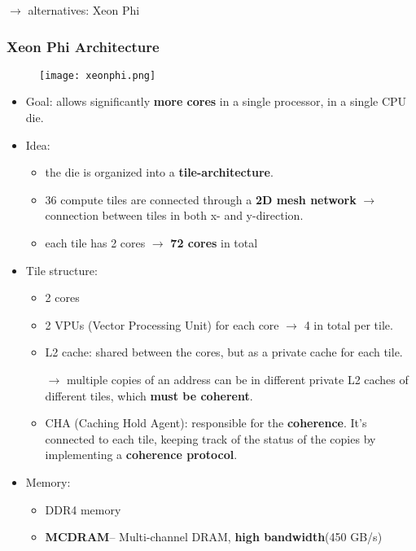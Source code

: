 $\rightarrow$ alternatives: Xeon Phi

\subsubsection{Xeon Phi Architecture} 
\begin{figure}[H]
	\centering
	\texttt{[image: xeonphi.png]}
\end{figure}
\begin{itemize}
	\item Goal: allows significantly \textbf{more cores} in a single processor, in a single CPU die.
	\item Idea: 
	\begin{itemize}
		\item the die is organized into a \textbf{tile-architecture}.
		\item 36 compute tiles are connected through a \textbf{2D mesh network} $\rightarrow$ connection between tiles in both x- and y-direction.
		\item each tile has 2 cores $\rightarrow$ \textbf{72 cores} in total
	\end{itemize}
	\item Tile structure:
	\begin{itemize}
		\item 2 cores
		\item 2 VPUs (Vector Processing Unit) for each core $\rightarrow$ 4 in total per tile.
		\item L2 cache: shared between the cores, but as a private cache for each tile. 
		
		$\rightarrow$ multiple copies of an address can be in different private L2 caches of different tiles, which \textbf{must be coherent}.
		\item CHA (Caching Hold Agent): responsible for the \textbf{coherence}. It's connected to each tile, keeping track of the status of the copies by implementing a \textbf{coherence protocol}. 
	\end{itemize}
	\item Memory: 
	\begin{itemize}
		\item DDR4 memory
		\item \textbf{MCDRAM}-- Multi-channel DRAM, \textbf{high bandwidth}(450 GB/s)
		

\end{itemize}
\end{itemize}
